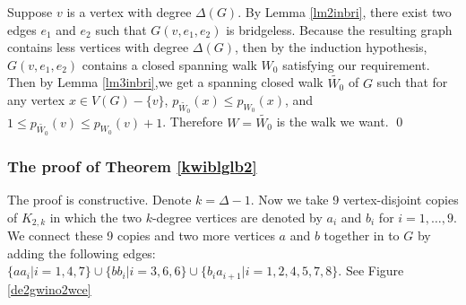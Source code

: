 \documentclass[12pt]{report}
\begin{document}
Suppose $v$ is a vertex with degree $\Delta(G)$. By Lemma \ref{lm2inbri}, there exist two edges $e_1$ and $e_2$ such that $G(v,e_1,e_2)$ is bridgeless. Because the resulting graph contains less vertices with degree $\Delta(G)$, then by the induction hypothesis, $G(v,e_1,e_2)$ contains a closed spanning walk $W_0$ satisfying our requirement. Then by Lemma \ref{lm3inbri},we get a spanning closed walk $\tilde{W_0}$ of $G$ such that for any vertex $x\in V(G)-\{v\}$, $p_{\tilde{W_0}}(x)\le p_{W_0}(x)$, and $1\le p_{\tilde{W_0}}(v)\le p_{W_0}(v)+1$. Therefore $W=\tilde{W_0}$ is the walk we want.
\qed






\subsubsection{The proof of Theorem \ref{kwiblglb2}}
The proof is constructive. Denote $k=\Delta-1$. Now we take 9 vertex-disjoint copies of $K_{2,k}$ in which the two $k$-degree vertices are denoted by $a_i$ and $b_i$ for $i=1,\ldots,9$. We connect these 9 copies and two more vertices $a$ and $b$ together in to $G$ by adding the following edges:
$\{aa_i|i=1,4,7\}\cup\{bb_i|i=3,6,6\}\cup\{b_ia_{i+1}|i=1,2,4,5,7,8\}$. See Figure \ref{de2gwino2wce}
\end{document}
